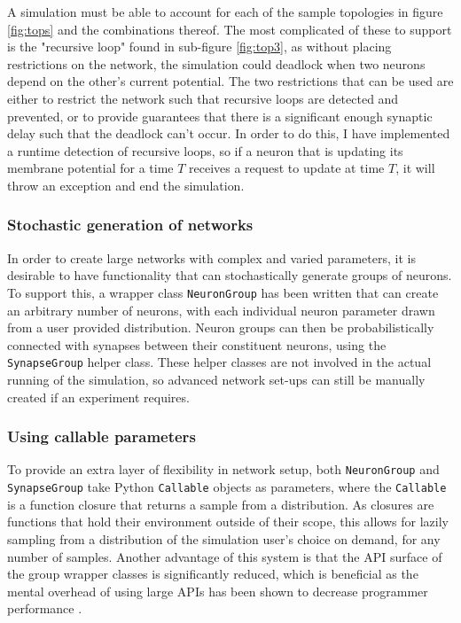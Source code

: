 A simulation must be able to account for each of the sample topologies in figure
\ref{fig:tops} and the combinations thereof. The most complicated of these to
support is the "recursive loop" found in sub-figure \ref{fig:top3}, as without
placing restrictions on the network, the simulation could deadlock when two
neurons depend on the other's current potential. The two restrictions that can
be used are either to restrict the network such that recursive loops are
detected and prevented, or to provide guarantees that there is a significant
enough synaptic delay such that the deadlock can't occur. In order to do this, I
have implemented a runtime detection of recursive loops, so if a neuron that is
updating its membrane potential for a time $T$ receives a request to update at
time $T$, it will throw an exception and end the simulation. 

\subsubsection{Stochastic generation of networks}

In order to create large networks with complex and varied parameters, it is
desirable to have functionality that can stochastically generate groups of
neurons. To support this, a wrapper class \texttt{NeuronGroup} has been written
that can create an arbitrary number of neurons, with each individual neuron
parameter drawn from a user provided distribution. Neuron groups can then be
probabilistically connected with synapses between their constituent neurons,
using the \texttt{SynapseGroup} helper class. These helper classes are not
involved in the actual running of the simulation, so advanced network set-ups
can still be manually created if an experiment requires.

\subsubsection{Using callable parameters}

To provide an extra layer of flexibility in network setup, both
\texttt{NeuronGroup} and \texttt{SynapseGroup} take Python \texttt{Callable}
objects as parameters, where the \texttt{Callable} is a function closure that
returns a sample from a distribution. As closures are functions that hold their
environment outside of their scope, this allows for lazily sampling from a distribution of the simulation user's choice on demand, for any
number of samples. Another advantage of this system is that the API surface of
the group wrapper classes is significantly reduced, which is beneficial as the
mental overhead of using large APIs has been shown to decrease programmer
performance \autocite{ellis_factory_2007,omar_active_2012}.